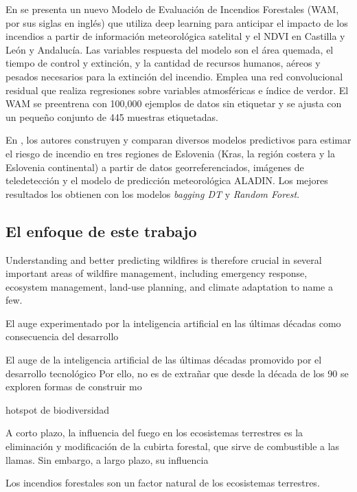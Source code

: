 \documentclass[12pt,a4paper,]{book}
\numberwithin{dummy}{section}
\theoremstyle{ocrenumbox}
\theoremstyle{blacknumex}
\theoremstyle{blacknumbox}
\theoremstyle{ocrenum}
\theoremstyle{ocrenum}
\begin{document}
En \citet{SpainOnFire} se presenta un nuevo Modelo de Evaluación de
Incendios Forestales (WAM, por sus siglas en inglés) que utiliza deep
learning para anticipar el impacto de los incendios a partir de
información meteorológica satelital y el NDVI en Castilla y León y
Andalucía. Las variables respuesta del modelo son el área quemada, el
tiempo de control y extinción, y la cantidad de recursos humanos, aéreos
y pesados necesarios para la extinción del incendio. Emplea una red
convolucional residual que realiza regresiones sobre variables
atmosféricas e índice de verdor. El WAM se preentrena con 100,000
ejemplos de datos sin etiquetar y se ajusta con un pequeño conjunto de
445 muestras etiquetadas.

En \citet{stojanova2012estimating}, los autores construyen y comparan
diversos modelos predictivos para estimar el riesgo de incendio en tres
regiones de Eslovenia (Kras, la región costera y la Eslovenia
continental) a partir de datos georreferenciados, imágenes de
teledetección y el modelo de predicción meteorológica ALADIN. Los
mejores resultados los obtienen con los modelos \emph{bagging DT} y
\emph{Random Forest}.

\hypertarget{el-enfoque-de-este-trabajo}{%
\subsection*{El enfoque de este
trabajo}\label{el-enfoque-de-este-trabajo}}

Understanding and better predicting wildfires is therefore crucial in
several important areas of wildfire management, including emergency
response, ecosystem management, land-use planning, and climate
adaptation to name a few.

El auge experimentado por la inteligencia artificial en las últimas
décadas como consecuencia del desarrollo

El auge de la inteligencia artificial de las últimas décadas promovido
por el desarrollo tecnológico Por ello, no es de extrañar que desde la
década de los 90 se exploren formas de construir mo

hotspot de biodiversidad

A corto plazo, la influencia del fuego en los ecosistemas terrestres es
la eliminación y modificación de la cubirta forestal, que sirve de
combustible a las llamas. Sin embargo, a largo plazo, su influencia

Los incendios forestales son un factor natural de los ecosistemas
terrestres.
\end{document}
